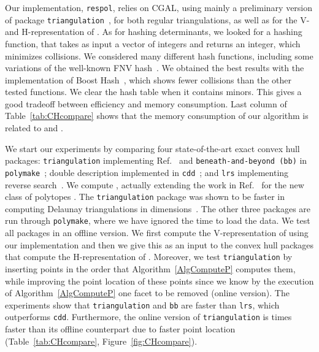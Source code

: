 \documentclass{article}
\newcommand\refcite[1]{\citealp{#1}} \newcommand\citess[1]{\textsuperscript{\textup{\citealp{#1}}}}
\begin{document}
Our implementation, {\tt respol}, relies on CGAL, using mainly a
preliminary version of package {\tt triangulation}~\citess{BoiDevHor09}, 
for both regular
triangulations, as well as for the V- and H-representation of .
As for hashing determinants, we looked for a hashing function, that takes
as input a vector of integers and returns an integer, which
minimizes collisions.
We considered many different hash functions, including some variations of
the well-known FNV hash~\citess{fnv}.
We obtained the best results with the implementation of Boost
Hash~\citess{boosthash}, which shows fewer collisions than the other tested
functions.
We clear the hash table when it contains  minors. This gives a good
tradeoff between efficiency and memory consumption. Last column of
Table~\ref{tab:CHcompare} shows that the memory consumption of our
algorithm is related to  and .

We start our experiments by comparing four state-\-of-\-the-\-art exact
convex hull packages: {\tt triangulation} implementing Ref.~\refcite{CMS93}
and 
{\tt beneath-\-and-\-beyond (bb)} in {\tt polymake}~\citess{GaJo02};
double description implemented in {\tt cdd}~\citess{cddFuku};
and {\tt lrs} implementing reverse search~\citess{Avis98lrs}.
We compute , actually extending the work in Ref.~\refcite{AvBrSe97}
for the new class of polytopes .
The {\tt triangulation} package was shown to be faster in computing Delaunay
triangulations in
 dimensions~\citess{BoiDevHor09}.  
The other three packages are run through {\tt polymake}, where we have ignored
the time to load the data.
We test all packages in an {offline version}. We first compute the
V-representation of  using our implementation and then we give this as
an input to the convex hull packages that compute the H-representation of
. Moreover, we test {\tt triangulation}
by inserting points in the order that Algorithm~\ref{AlgComputeP} computes them,
while improving the point location of these points since we know by the
execution of Algorithm~\ref{AlgComputeP} one facet to be  removed (online version).
The experiments show that {\tt triangulation} and {\tt bb}
are faster than {\tt lrs}, which outperforms {\tt cdd}. 
Furthermore, the online version of {\tt triangulation} is  times
faster than its offline counterpart due to faster point location
(Table~\ref{tab:CHcompare}, Figure~\ref{fig:CHcompare}).
\end{document}
